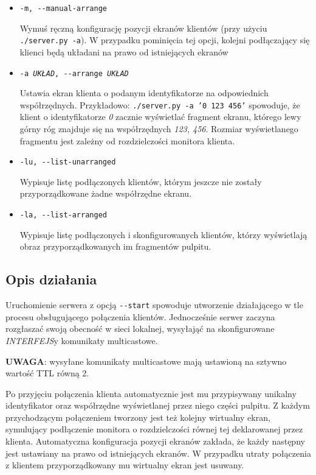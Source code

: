 \begin{itemize}
    \item \texttt{-m, -{}-manual-arrange}

      Wymuś ręczną konfigurację pozycji ekranów klientów (przy użyciu \texttt{./server.py -a}). W przypadku pominięcia tej opcji, kolejni podłączający się klienci będą układani na prawo od istniejących ekranów

    \item \texttt{-a \emph{UKŁAD}, -{}-arrange \emph{UKŁAD}}

      Ustawia ekran klienta o podanym identyfikatorze na odpowiednich współrzędnych. Przykładowo: \texttt{./server.py -a '0 123 456'} spowoduje, że klient o identyfikatorze \emph{0} zacznie wyświetlać fragment ekranu, którego lewy górny róg znajduje się na współrzędnych \emph{123, 456}. Rozmiar wyświetlanego fragmentu jest zależny od rozdzielczości monitora klienta.

    \item \texttt{-lu, -{}-list-unarranged}

      Wypisuje listę podłączonych klientów, którym jeszcze nie zostały przyporządkowane żadne współrzędne ekranu.

    \item \texttt{-la, -{}-list-arranged}

      Wypisuje listę podłączonych i skonfigurowanych klientów, którzy wyświetlają obraz przyporządkowanych im fragmentów pulpitu.

  \end{itemize}

  \subsection{Opis działania}
    Uruchomienie serwera z opcją \texttt{-{}-start} spowoduje utworzenie działającego w tle procesu obsługującego połączenia klientów. Jednocześnie serwer zaczyna rozgłaszać swoją obecność w sieci lokalnej, wysyłająć na skonfigurowane \emph{INTERFEJS}y komunikaty multicastowe.

    \textbf{UWAGA}: wysyłane komunikaty multicastowe mają ustawioną na sztywno wartość TTL równą 2.

    Po przyjęciu połączenia klienta automatycznie jest mu przypisywany unikalny identyfikator oraz współrzędne wyświetlanej przez niego części pulpitu. Z każdym przychodzącym połączeniem tworzony jest też kolejny wirtualny ekran, symulujący podłączenie monitora o rozdzielczości równej tej deklarowanej przez klienta. Automatyczna konfiguracja pozycji ekranów zakłada, że każdy następny jest ustawiany na prawo od istniejących ekranów.
    W przypadku utraty połączenia z klientem przyporządkowany mu wirtualny ekran jest usuwany.

